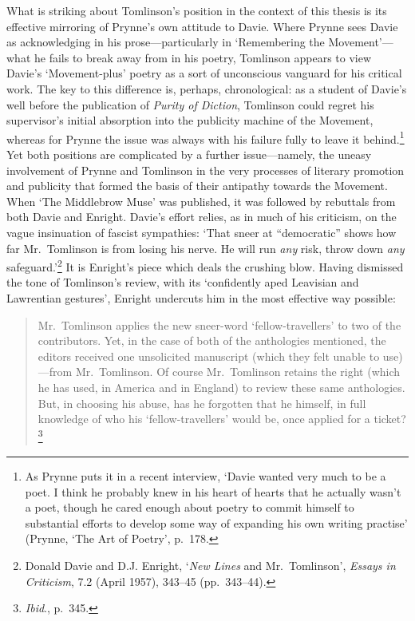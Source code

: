 \documentclass[]{article}
\begin{document}
What is striking about Tomlinson’s position in the context of this
thesis is its effective mirroring of Prynne’s own attitude to Davie.
Where Prynne sees Davie as acknowledging in his prose—particularly in
‘Remembering the Movement’—what he fails to break away from in his
poetry, Tomlinson appears to view Davie’s ‘Movement-plus’ poetry as a
sort of unconscious vanguard for his critical work. The key to this
difference is, perhaps, chronological: as a student of Davie’s well
before the publication of \emph{Purity of Diction}, Tomlinson could
regret his supervisor’s initial absorption into the publicity machine of
the Movement, whereas for Prynne the issue was always with his failure
fully to leave it behind.\footnote{As Prynne puts it in a recent
  interview, ‘Davie wanted very much to be a poet. I think he probably
  knew in his heart of hearts that he actually wasn’t a poet, though he
  cared enough about poetry to commit himself to substantial efforts to
  develop some way of expanding his own writing practise’ (Prynne, ‘The
  Art of Poetry’, p.~178.} Yet both positions are complicated by a
further issue—namely, the uneasy involvement of Prynne and Tomlinson in
the very processes of literary promotion and publicity that formed the
basis of their antipathy towards the Movement. When ‘The Middlebrow
Muse’ was published, it was followed by rebuttals from both Davie and
Enright. Davie’s effort relies, as in much of his criticism, on the
vague insinuation of fascist sympathies: ‘That sneer at “democratic”
shows how far Mr.~Tomlinson is from losing his nerve. He will run
\emph{any} risk, throw down \emph{any} safeguard.’\footnote{Donald Davie
  and D.J. Enright, ‘\emph{New Lines} and Mr.~Tomlinson’, \emph{Essays
  in Criticism}, 7.2 (April 1957), 343–45 (pp.~343–44).} It is Enright’s
piece which deals the crushing blow. Having dismissed the tone of
Tomlinson’s review, with its ‘confidently aped Leavisian and Lawrentian
gestures’, Enright undercuts him in the most effective way possible:

\begin{quote}
\singlespacing Mr.~Tomlinson applies the new sneer-word
‘fellow-travellers’ to two of the contributors. Yet, in the case of both
of the anthologies mentioned, the editors received one unsolicited
manuscript (which they felt unable to use)—from Mr.~Tomlinson. Of course
Mr.~Tomlinson retains the right (which he has used, in America and in
England) to review these same anthologies. But, in choosing his abuse,
has he forgotten that he himself, in full knowledge of who his
‘fellow-travellers’ would be, once applied for a ticket?\footnote{\emph{Ibid}.,
  p.~345.}
\end{quote}
\end{document}
